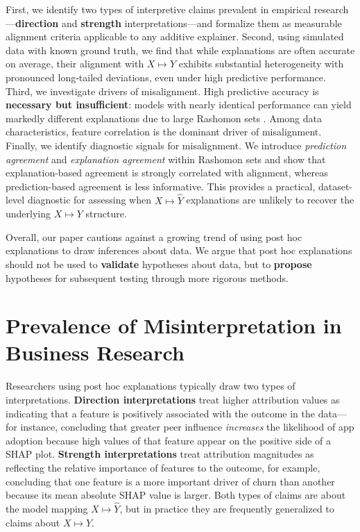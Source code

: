 \documentclass[11pt]{article}
\begin{document}
First, we identify two types of interpretive claims prevalent in empirical research—\textbf{direction} and \textbf{strength} interpretations—and formalize them as measurable alignment criteria applicable to any additive explainer. Second, using simulated data with known ground truth, we find that while explanations are often accurate on average, their alignment with $X \mapsto Y$ exhibits substantial heterogeneity with pronounced long-tailed deviations, even under high predictive performance. Third, we investigate drivers of misalignment. High predictive accuracy is \textbf{necessary but insufficient}: models with nearly identical performance can yield markedly different explanations due to large Rashomon sets \citep{semenova22rashomon,paes23inevitable}. Among data characteristics, feature correlation is the dominant driver of misalignment. Finally, we identify diagnostic signals for misalignment. We introduce \emph{prediction agreement} and \emph{explanation agreement} within Rashomon sets and show that explanation-based agreement is strongly correlated with alignment, whereas prediction-based agreement is less informative. This provides a practical, dataset-level diagnostic for assessing when $X \mapsto \hat{Y}$ explanations are unlikely to recover the underlying $X \mapsto Y$ structure.

Overall, our paper cautions against a growing trend of using post hoc explanations to draw inferences about data. We argue that post hoc explanations should not be used to \textbf{validate} hypotheses about data, but to \textbf{propose} hypotheses for subsequent testing through more rigorous methods.


   \vspace{-0.1cm}
\section{Prevalence of Misinterpretation in Business Research}\vspace{-0.1cm}

Researchers using post hoc explanations typically draw two types of interpretations. \textbf{Direction interpretations} treat higher attribution values as indicating that a feature is positively associated with the outcome in the data---for instance, concluding that greater peer influence \emph{increases} the likelihood of app adoption because high values of that feature appear on the positive side of a SHAP plot. \textbf{Strength interpretations} treat attribution magnitudes as reflecting the relative importance of features to the outcome, for example, concluding that one feature is a more important driver of churn than another because its mean absolute SHAP value is larger. Both types of claims are about the model mapping $X \mapsto \hat{Y}$, but in practice they are frequently generalized to claims about $X \mapsto Y$.
\end{document}
